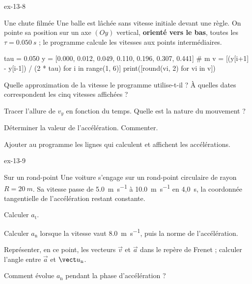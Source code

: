 \begin{blocLivre}{ex-13-8}
\begin{exercice}[2]{Une chute filmée}
Une balle est lâchée sans vitesse initiale devant une règle. On pointe sa position sur un axe $(Oy)$ vertical,
\textbf{orienté vers le bas}, toutes les $\tau=\qty{0,050}{s}$ ; le programme calcule les vitesses aux points
intermédiaires.
\begin{python}
tau = 0.050
y = [0.000, 0.012, 0.049, 0.110, 0.196, 0.307, 0.441]   # m
v = [(y[i+1] - y[i-1]) / (2 * tau) for i in range(1, 6)]
print([round(vi, 2) for vi in v])
\end{python}
\begin{console}
[0.49, 0.98, 1.47, 1.97, 2.45]
\end{console}
\begin{questions}
\item {}Quelle approximation de la vitesse le programme utilise-t-il ? À quelles dates
correspondent les cinq vitesses affichées ?
\item Tracer l'allure de $v_y$ en fonction du temps. Quelle est la nature du mouvement ?
\item Déterminer la valeur de l'accélération. Commenter.
\item Ajouter au programme les lignes qui calculent et affichent les accélérations.
\end{questions}
\end{exercice}
\end{blocLivre}
\begin{blocLivre}{ex-13-9}
\begin{exercice}[2]{Sur un rond-point}
Une voiture s'engage sur un rond-point circulaire de rayon $R=\qty{20}{m}$. Sa vitesse passe de \qty{5,0}{m.s^{-1}} à
\qty{10,0}{m.s^{-1}} en 4,0~s, la coordonnée tangentielle de l'accélération restant constante.
\begin{questions}
\item Calculer $a_\mathrm{t}$.
\item Calculer $a_\mathrm{n}$ lorsque la vitesse vaut \qty{8,0}{m.s^{-1}}, puis la norme de l'accélération.
\item Représenter, en ce point, les vecteurs $\vec{v}$ et $\vec{a}$ dans le repère de Frenet ; calculer l'angle entre
$\vec{a}$ et $\un$.
\item Comment évolue $a_\mathrm{n}$ pendant la phase d'accélération ?
\end{questions}
\end{exercice}
\end{blocLivre}
